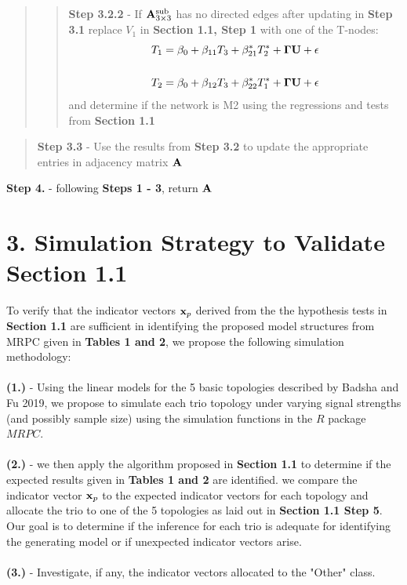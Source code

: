 \documentclass[12pt]{report}
\begin{document}
\begin{quote}
\begin{quote}
\noindent\textbf{Step 3.2.2} - If ${\bf A}_{3\times3}^{\text{sub}}$ has no directed edges after updating in \textbf{Step 3.1} replace $V_1$ in \textbf{Section 1.1, Step 1} with one of the T-nodes:
\begin{eqnarray}
T_1 = \beta_0 +\beta_{11}T_3+\beta_{21}^{\ast}T_2^{\ast}+{\bf \Gamma U}+ \epsilon \\
\nonumber\\
T_2 = \beta_0 +\beta_{12}T_3+\beta_{22}^{\ast}T_1^{\ast}+{\bf \Gamma U}+ \epsilon 
\end{eqnarray}
and determine if the network is M2 using the regressions and tests from \textbf{Section 1.1}\\
\end{quote} 
\end{quote}

\begin{quote}
\noindent \textbf{Step 3.3} - Use the results from \textbf{Step 3.2} to update the appropriate entries in adjacency matrix $\bf{A}$\\
\end{quote}

\noindent \textbf{Step 4.} - following \textbf{Steps 1 - 3}, return $\bf A$

\section*{3. Simulation Strategy to Validate Section 1.1}

To verify that the indicator vectors ${\bf x}_p$ derived from the the hypothesis tests in \textbf{Section 1.1} are sufficient in identifying the proposed model structures from MRPC given in \textbf{Tables 1 and 2}, we propose the following simulation methodology: \\
\\

\noindent \textbf{(1.)} - Using the linear models for the 5 basic topologies described by Badsha and Fu 2019, we propose to simulate each trio topology under varying signal strengths (and possibly sample size) using the simulation functions in the $R$ package $MRPC$.\\
\\
\noindent \textbf{(2.)}  - we then apply the algorithm proposed in \textbf{Section 1.1} to determine if the expected results given in \textbf{ Tables 1 and 2} are identified. we compare the indicator vector ${\bf x}_p$ to the expected indicator vectors for each topology and allocate the trio to one of the 5 topologies as laid out in \textbf{Section 1.1 Step 5}. Our goal is to determine if the inference for each trio is adequate for identifying the generating model or if unexpected indicator vectors arise. \\
\\
\textbf{(3.)} - Investigate, if any, the indicator vectors allocated to the "Other" class. 
\end{document}
